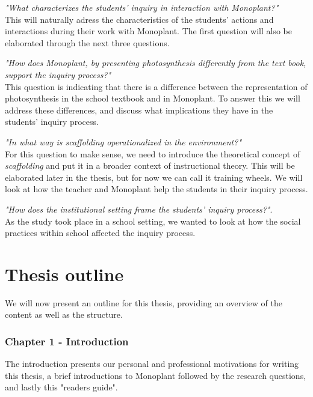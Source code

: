 \begin{noindlist}
\item \emph{"What characterizes the students’ inquiry in interaction with Monoplant?"}\\
This will naturally adress the characteristics of the students' actions and interactions during their work with Monoplant. The first question will also be elaborated through the next three questions.
\item \emph{"How does Monoplant, by presenting photosynthesis differently from the text book, support the inquiry process?"}\\
This question is indicating that there is a difference between the representation of photosynthesis in the school textbook and in Monoplant. To answer this we will address these differences, and discuss what implications they have in the students' inquiry process.
\item \emph{"In what way is scaffolding operationalized in the environment?"}\\
For this question to make sense, we need to introduce the theoretical concept of \emph{scaffolding} and put it in a broader context of instructional theory. This will be elaborated later in the thesis, but for now we can call it training wheels. We will look at how the teacher and Monoplant help the students in their inquiry process.
\item \emph{"How does the institutional setting frame the students' inquiry process?"}.\\
As the study took place in a school setting, we wanted to look at how the social practices within school affected the inquiry process.
\end{noindlist}


\section{Thesis outline}
We will now present an outline for this thesis, providing an overview of the content as well as the structure. 

\subsubsection*{Chapter 1 - Introduction}
The introduction presents our personal and professional motivations for writing this thesis, a brief introductions to Monoplant followed by the research questions, and lastly this "readers guide".

